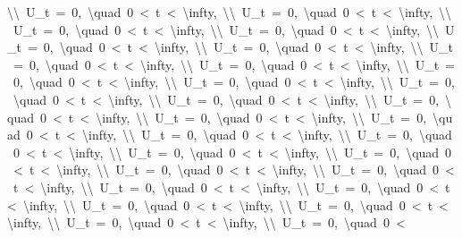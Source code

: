 \documentclass[
  ukrainian,
]{article}
\begin{document}
\textbackslash{}\textbackslash{}\ U\_t\ =\ 0,\ \textbackslash{}quad\ 0\ \textless{}\ t\ \textless{}\ \textbackslash{}infty,\ \textbackslash{}\textbackslash{}\ U\_t\ =\ 0,\ \textbackslash{}quad\ 0\ \textless{}\ t\ \textless{}\ \textbackslash{}infty,\ \textbackslash{}\textbackslash{}\ U\_t\ =\ 0,\ \textbackslash{}quad\ 0\ \textless{}\ t\ \textless{}\ \textbackslash{}infty,\ \textbackslash{}\textbackslash{}\ U\_t\ =\ 0,\ \textbackslash{}quad\ 0\ \textless{}\ t\ \textless{}\ \textbackslash{}infty,\ \textbackslash{}\textbackslash{}\ U\_t\ =\ 0,\ \textbackslash{}quad\ 0\ \textless{}\ t\ \textless{}\ \textbackslash{}infty,\ \textbackslash{}\textbackslash{}\ U\_t\ =\ 0,\ \textbackslash{}quad\ 0\ \textless{}\ t\ \textless{}\ \textbackslash{}infty,\ \textbackslash{}\textbackslash{}\ U\_t\ =\ 0,\ \textbackslash{}quad\ 0\ \textless{}\ t\ \textless{}\ \textbackslash{}infty,\ \textbackslash{}\textbackslash{}\ U\_t\ =\ 0,\ \textbackslash{}quad\ 0\ \textless{}\ t\ \textless{}\ \textbackslash{}infty,\ \textbackslash{}\textbackslash{}\ U\_t\ =\ 0,\ \textbackslash{}quad\ 0\ \textless{}\ t\ \textless{}\ \textbackslash{}infty,\ \textbackslash{}\textbackslash{}\ U\_t\ =\ 0,\ \textbackslash{}quad\ 0\ \textless{}\ t\ \textless{}\ \textbackslash{}infty,\ \textbackslash{}\textbackslash{}\ U\_t\ =\ 0,\ \textbackslash{}quad\ 0\ \textless{}\ t\ \textless{}\ \textbackslash{}infty,\ \textbackslash{}\textbackslash{}\ U\_t\ =\ 0,\ \textbackslash{}quad\ 0\ \textless{}\ t\ \textless{}\ \textbackslash{}infty,\ \textbackslash{}\textbackslash{}\ U\_t\ =\ 0,\ \textbackslash{}quad\ 0\ \textless{}\ t\ \textless{}\ \textbackslash{}infty,\ \textbackslash{}\textbackslash{}\ U\_t\ =\ 0,\ \textbackslash{}quad\ 0\ \textless{}\ t\ \textless{}\ \textbackslash{}infty,\ \textbackslash{}\textbackslash{}\ U\_t\ =\ 0,\ \textbackslash{}quad\ 0\ \textless{}\ t\ \textless{}\ \textbackslash{}infty,\ \textbackslash{}\textbackslash{}\ U\_t\ =\ 0,\ \textbackslash{}quad\ 0\ \textless{}\ t\ \textless{}\ \textbackslash{}infty,\ \textbackslash{}\textbackslash{}\ U\_t\ =\ 0,\ \textbackslash{}quad\ 0\ \textless{}\ t\ \textless{}\ \textbackslash{}infty,\ \textbackslash{}\textbackslash{}\ U\_t\ =\ 0,\ \textbackslash{}quad\ 0\ \textless{}\ t\ \textless{}\ \textbackslash{}infty,\ \textbackslash{}\textbackslash{}\ U\_t\ =\ 0,\ \textbackslash{}quad\ 0\ \textless{}\ t\ \textless{}\ \textbackslash{}infty,\ \textbackslash{}\textbackslash{}\ U\_t\ =\ 0,\ \textbackslash{}quad\ 0\ \textless{}\ t\ \textless{}\ \textbackslash{}infty,\ \textbackslash{}\textbackslash{}\ U\_t\ =\ 0,\ \textbackslash{}quad\ 0\ \textless{}\ t\ \textless{}\ \textbackslash{}infty,\ \textbackslash{}\textbackslash{}\ U\_t\ =\ 0,\ \textbackslash{}quad\ 0\ \textless{}\ t\ \textless{}\ \textbackslash{}infty,\ \textbackslash{}\textbackslash{}\ U\_t\ =\ 0,\ \textbackslash{}quad\ 0\ \textless{}\ t\ \textless{}\ \textbackslash{}infty,\ \textbackslash{}\textbackslash{}\ U\_t\ =\ 0,\ \textbackslash{}quad\ 0\ \textless{}\ t\ \textless{}\ \textbackslash{}infty,\ \textbackslash{}\textbackslash{}\ U\_t\ =\ 0,\ \textbackslash{}quad\ 0\ \textless{}\ t\ \textless{}\ \textbackslash{}infty,\ \textbackslash{}\textbackslash{}\ U\_t\ =\ 0,\ \textbackslash{}quad\ 0\ \textless{}\ t\ \textless{}\ \textbackslash{}infty,\ \textbackslash{}\textbackslash{}\ U\_t\ =\ 0,\ \textbackslash{}quad\ 0\ \textless{}\ 
\end{document}
